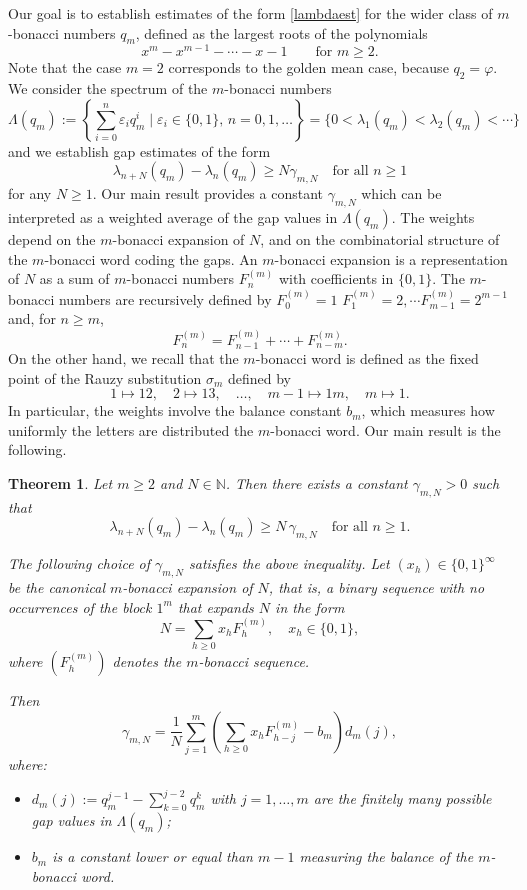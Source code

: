 \documentclass{amsart}
\newtheorem{theorem}{Theorem}[section]
\begin{document}
Our goal is to establish estimates of the form \eqref{lambdaest} for the wider class of $m$-bonacci numbers $q_m$, defined as the largest roots of the polynomials 
$$x^m-x^{m-1}-\cdots -x-1 \qquad \text{for } m\geq 2.$$
Note that the case $m=2$ corresponds to the golden mean case, because $q_2=\varphi$. We consider the spectrum of the $m$-bonacci numbers
$$\Lambda(q_m):=\left\{\sum_{i=0}^n\varepsilon_iq_m^i\mid \varepsilon_{i}\in\{0,1\},\, n=0,1,\dots\right\}=\{0<\lambda_1(q_m)<\lambda_2(q_m)<\cdots\}$$
and we establish gap estimates  of the form 
$$\lambda_{n+N}(q_m)-\lambda_{n}(q_m)\geq N\gamma_{m,N} \quad \text{for all }n\geq 1$$
 for any $N\geq 1$. Our main result provides a constant $\gamma_{m,N}$ which can be interpreted as a weighted average of the gap values in $\Lambda(q_m)$. The weights depend on the $m$-bonacci expansion of $N$,  and on the combinatorial structure of
the $m$-bonacci word coding the gaps. 
An $m$-bonacci expansion is a representation
of $N$ as a sum 
 of $m$-bonacci numbers $F^{(m)}_n$ with coefficients in $\{0,1\}$. The $m$-bonacci numbers are recursively defined by 
$F^{(m)}_0=1$ $F^{(m)}_1=2, \cdots F^{(m)}_{m-1}=2^{m-1}$
and, for $n\geq m$,
$$F^{(m)}_n=F^{(m)}_{n-1}+\cdots +F^{(m)}_{n-m}.$$
On the other hand, we recall that the $m$-bonacci word is defined as the fixed point of the Rauzy
substitution $\sigma_m$ defined by 
$$1\mapsto 12,\quad 2\mapsto 13,\quad \dots, \quad m-1\mapsto 1m, \quad m\mapsto 1.$$
In particular, the weights involve the balance constant $b_m$, which measures how uniformly the letters are distributed the $m$-bonacci word. 
Our main result is the following.  
\begin{theorem}\label{thm1i}
Let $m\geq 2$ and $N\in \mathbb{N}$. Then there exists a constant
$\gamma_{m,N}>0$ such that
\begin{equation}\label{gamma}
\lambda_{n+N}(q_m)-\lambda_n(q_m)\geq N\,\gamma_{m,N}
\quad \text{for all } n\geq 1.
\end{equation}

The following choice of $\gamma_{m,N}$ satisfies the above inequality.
Let $(x_h)\in\{0,1\}^\infty$ be the canonical $m$-bonacci expansion of $N$, that is,
a binary sequence with no occurrences of the block $1^m$ that expands $N$ in the form
\[
N=\sum_{h\geq 0} x_h F^{(m)}_h,
\quad x_h\in\{0,1\},
\]
where $(F^{(m)}_h)$ denotes the $m$-bonacci sequence.

Then
\begin{equation}\label{eqgamma}
\gamma_{m,N}
=\frac{1}{N}
\sum_{j=1}^m
\left(
\sum_{h\geq 0} x_h F^{(m)}_{h-j}
- b_m
\right)
d_m(j),
\end{equation}
where:
\begin{itemize}
\item[-] $d_m(j):=q_m^{j-1}-\sum_{k=0}^{j-2} q_m^k$ with $j=1,\dots,m$ are the finitely many possible gap values in $\Lambda(q_m)$;
\item[-] $b_m$ is a constant lower or equal than $m-1$ measuring the balance of the $m$-bonacci word.
\end{itemize}
\end{theorem}
\end{document}
